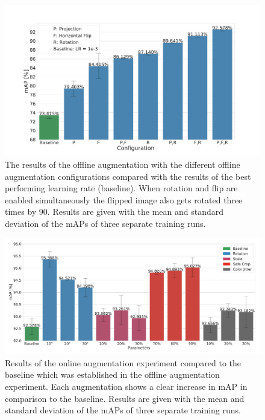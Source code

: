 \begin{figure}[t!]
\begin{center}
    \includegraphics[width=13cm]{imgs/yolo_offline_aug_experiment.pdf}
    \caption{The results of the offline augmentation with the different offline augmentation configurations compared with the results of the best performing learning rate (baseline). When rotation and flip are enabled simultaneously the flipped image also gets rotated three times by 90\textdegree. Results are given with the mean and standard deviation of the \acp{mAP} of three separate training runs.}
    \label{fig:yolo_offline_aug_results}
\end{center}
\end{figure}

\begin{figure}[b!]
\begin{center}
    \includegraphics[width=16cm]{imgs/yolo_online_aug_experiment.pdf}
    \caption{Results of the online augmentation experiment compared to the baseline which was established in the offline augmentation experiment. Each augmentation shows a clear increase in \ac{mAP} in comparison to the baseline. Results are given with the mean and standard deviation of the \acp{mAP} of three separate training runs.}
    \label{fig:yolo_online_aug_results}
\end{center}
\end{figure}


